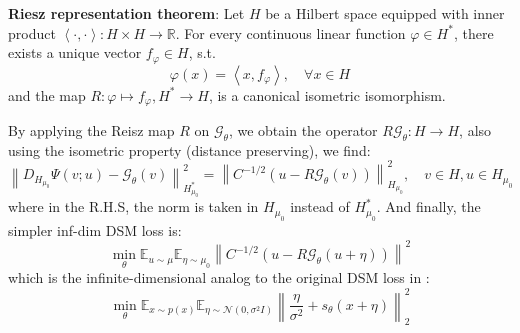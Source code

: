 \documentclass{article}
\begin{document}
\begin{theorem}
    \noindent\textbf{Riesz representation theorem}: Let $H$ be a Hilbert space equipped with inner product $\left\langle \cdot,\cdot\right\rangle:H\times H\to\mathbb{R}$. For every continuous linear function $\varphi\in H^*$, there exists a unique vector $f_\varphi \in H$, s.t.
\begin{equation}
    \varphi(x) = \left\langle x, f_\varphi\right\rangle, \quad \forall x\in H 
\end{equation} 
and the map $R:\varphi\mapsto f_\varphi, H^*\to H$, is a canonical isometric isomorphism.
\end{theorem}

By applying the Reisz map $R$ on $\mathcal{G}_\theta$, we obtain the operator $R\mathcal{G}_{\theta}:H\to H$, also using the isometric property (distance preserving), we find:
\begin{equation}
    \left\lVert D_{H_{\mu_0}}\Psi(v;u) - \mathcal{G}_\theta(v)\right\rVert^2_{H^*_{\mu_0}} = \left\lVert C^{-1/2}(u-R\mathcal{G}_\theta(v))\right\rVert^2_{H_{\mu_0}},\quad v\in H, u\in H_{\mu_0} 
\end{equation}
where in the R.H.S, the norm is taken in $H_{\mu_0}$ instead of $H^*_{\mu_0}$. And finally, the simpler inf-dim DSM loss is:
\begin{equation} \label{eq: inf-dim dsm}
    \underset{\theta}{\min}\mathbb{E}_{u\sim\mu}\mathbb{E}_{\eta\sim\mu_0}\left\lVert C^{-1/2}(u-R\mathcal{G}_\theta(u+\eta))\right\rVert^2 
\end{equation}
which is the infinite-dimensional analog to the original DSM loss in \cite{vincent2011connection}:
\begin{equation}
    \underset{\theta}{\min}\mathbb{E}_{x\sim p(x)}\mathbb{E}_{\eta\sim\mathcal{N}(0, \sigma^2I)}\left\lVert \frac{\eta}{\sigma^2} + s_\theta(x+\eta)\right\rVert^2_2
\end{equation}
\end{document}
